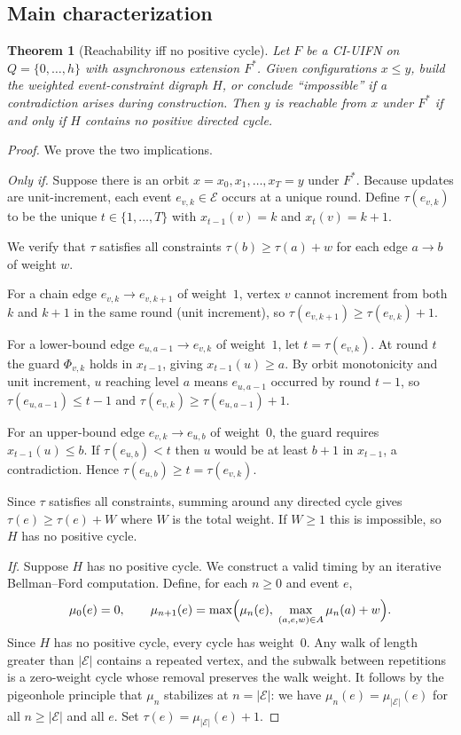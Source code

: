\documentclass[final,3p,times]{elsarticle}
\newtheorem{theorem}{Theorem}
\theoremstyle{definition}
\theoremstyle{remark}
\newcommand{\cE}{\mathcal{E}}
\begin{document}
\subsection*{Main characterization}

\begin{theorem}[Reachability iff no positive cycle]\label{thm:main}
Let $F$ be a CI-UIFN on $Q=\{0,\dots,h\}$ with asynchronous extension $F^\ast$.
Given configurations $x\le y$, build the weighted event-constraint digraph $H$, or conclude ``impossible'' if a contradiction arises during construction.
Then $y$ is reachable from $x$ under $F^\ast$ if and only if $H$ contains no positive directed cycle.
\end{theorem}

\begin{proof}
We prove the two implications.

\medskip
\noindent\textit{Only if.}\;
Suppose there is an orbit $x=x_0,x_1,\dots,x_T=y$ under $F^\ast$.
Because updates are unit-increment, each event $e_{v,k}\in\cE$ occurs at a unique round.
Define $\tau(e_{v,k})$ to be the unique $t\in\{1,\dots,T\}$ with $x_{t-1}(v)=k$ and $x_t(v)=k+1$.

We verify that $\tau$ satisfies all constraints $\tau(b)\ge\tau(a)+w$ for each edge $a\to b$ of weight $w$.

For a chain edge $e_{v,k}\to e_{v,k+1}$ of weight~$1$, vertex $v$ cannot increment from both $k$ and $k+1$ in the same round (unit increment), so $\tau(e_{v,k+1})\ge\tau(e_{v,k})+1$.

For a lower-bound edge $e_{u,a-1}\to e_{v,k}$ of weight~$1$, let $t=\tau(e_{v,k})$.
At round $t$ the guard $\Phi_{v,k}$ holds in $x_{t-1}$, giving $x_{t-1}(u)\ge a$.
By orbit monotonicity and unit increment, $u$ reaching level $a$ means $e_{u,a-1}$ occurred by round $t-1$, so $\tau(e_{u,a-1})\le t-1$ and $\tau(e_{v,k})\ge\tau(e_{u,a-1})+1$.

For an upper-bound edge $e_{v,k}\to e_{u,b}$ of weight~$0$, the guard requires $x_{t-1}(u)\le b$.
If $\tau(e_{u,b})<t$ then $u$ would be at least $b+1$ in $x_{t-1}$, a contradiction.
Hence $\tau(e_{u,b})\ge t=\tau(e_{v,k})$.

Since $\tau$ satisfies all constraints, summing around any directed cycle gives $\tau(e)\ge\tau(e)+W$ where $W$ is the total weight.
If $W\ge 1$ this is impossible, so $H$ has no positive cycle.

\medskip
\noindent\textit{If.}\;
Suppose $H$ has no positive cycle.
We construct a valid timing by an iterative Bellman--Ford computation.
Define, for each $n\ge 0$ and event $e$,
\[
\mu_0(e)=0,\qquad
\mu_{n+1}(e)=\max\Bigl(\mu_n(e),\;\max_{(a,e,w)\in A}\mu_n(a)+w\Bigr).
\]
Since $H$ has no positive cycle, every cycle has weight~$0$.
Any walk of length greater than $|\cE|$ contains a repeated vertex, and the subwalk between repetitions is a zero-weight cycle whose removal preserves the walk weight.
It follows by the pigeonhole principle that $\mu_n$ stabilizes at $n=|\cE|$: we have $\mu_n(e)=\mu_{|\cE|}(e)$ for all $n\ge|\cE|$ and all $e$.
Set $\tau(e)=\mu_{|\cE|}(e)+1$.


\end{proof}
\end{document}
